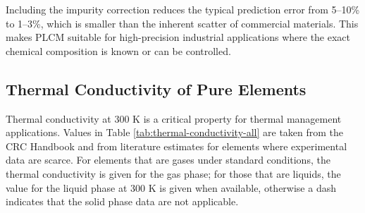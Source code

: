 \documentclass[12pt,a4paper]{article}
\begin{document}
	Including the impurity correction reduces the typical prediction error from 5--10\% to 1--3\%, which is smaller than the inherent scatter of commercial materials. This makes PLCM suitable for high-precision industrial applications where the exact chemical composition is known or can be controlled.
	
	\subsection{Thermal Conductivity of Pure Elements}
	\label{subsec:thermal-conductivity-elements}
	
	Thermal conductivity at 300 K is a critical property for thermal management applications. Values in Table \ref{tab:thermal-conductivity-all} are taken from the CRC Handbook \cite{CRC} and from literature estimates for elements where experimental data are scarce. For elements that are gases under standard conditions, the thermal conductivity is given for the gas phase; for those that are liquids, the value for the liquid phase at 300 K is given when available, otherwise a dash indicates that the solid phase data are not applicable.
	
\end{document}
